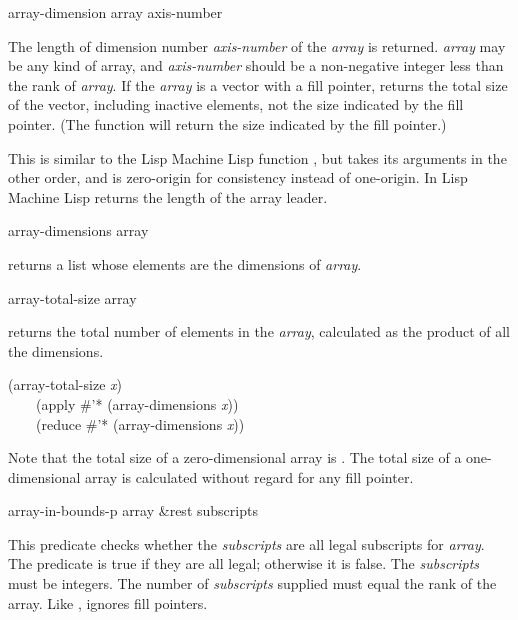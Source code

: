 \begin{defun}[Function]
array-dimension array axis-number

The length of dimension number \emph{axis-number} of the \emph{array} is returned.
\emph{array} may be any kind of array, and \emph{axis-number} should
be a non-negative integer less than the rank of \emph{array}.
If the \emph{array} is a vector with a fill pointer,
 returns the total size of the vector,
including inactive elements,
not the size indicated by the fill pointer.
(The function  will return the size indicated
by the fill pointer.)

\beforenoterule
\begin{incompatibility}
This is similar to the Lisp Machine Lisp function
, but takes its arguments in the other
order, and is zero-origin for consistency
instead of one-origin.  In Lisp Machine Lisp 
returns the length of the array leader.
\end{incompatibility}
\afternoterule
\end{defun}

\begin{defun}[Function]
array-dimensions array

 returns a list whose elements are the dimensions
of \emph{array}.
\end{defun}

\begin{defun}[Function]
array-total-size array

 returns the total number of elements in the \emph{array},
calculated as the product of all the dimensions.
\begin{lisp}
(array-total-size \emph{x}) \\
~~~\EQ\ (apply \#'* (array-dimensions \emph{x})) \\
~~~\EQ\ (reduce \#'* (array-dimensions \emph{x}))
\end{lisp}
Note that the total size of a zero-dimensional array is .
The total size of a one-dimensional array is calculated without regard
for any fill pointer.
\end{defun}

\begin{defun}[Function]
array-in-bounds-p array &rest subscripts

This predicate checks whether the \emph{subscripts} are all
legal subscripts for \emph{array}.  The predicate is true if they
are all legal; otherwise it is false.  The \emph{subscripts} must be integers.
The number of \emph{subscripts} supplied must equal the rank of the array.
Like ,  ignores fill pointers.
\end{defun}

